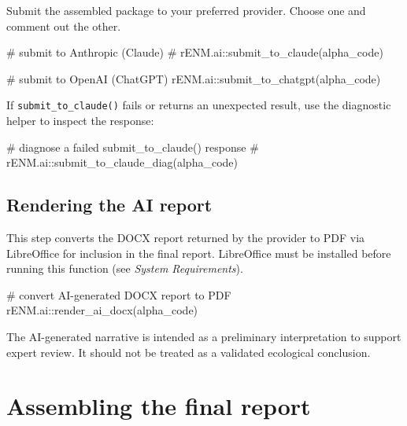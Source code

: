 \documentclass[
  letterpaper,
  DIV=11,
  numbers=noendperiod]{scrartcl}
\newenvironment{Shaded}{\begin{snugshade}}{\end{snugshade}}
\newcommand{\CommentTok}[1]{\textcolor[rgb]{0.37,0.37,0.37}{#1}}
\newcommand{\FunctionTok}[1]{\textcolor[rgb]{0.28,0.35,0.67}{#1}}
\newcommand{\NormalTok}[1]{\textcolor[rgb]{0.00,0.23,0.31}{#1}}
\newcommand{\SpecialCharTok}[1]{\textcolor[rgb]{0.37,0.37,0.37}{#1}}
\begin{document}
Submit the assembled package to your preferred provider. Choose one and
comment out the other.

\begin{Shaded}
\begin{Highlighting}[]
\CommentTok{\# submit to Anthropic (Claude)}
\CommentTok{\# rENM.ai::submit\_to\_claude(alpha\_code)}

\CommentTok{\# submit to OpenAI (ChatGPT)}
\NormalTok{rENM.ai}\SpecialCharTok{::}\FunctionTok{submit\_to\_chatgpt}\NormalTok{(alpha\_code)}
\end{Highlighting}
\end{Shaded}

If \texttt{submit\_to\_claude()} fails or returns an unexpected result,
use the diagnostic helper to inspect the response:

\begin{Shaded}
\begin{Highlighting}[]
\CommentTok{\# diagnose a failed submit\_to\_claude() response}
\CommentTok{\# rENM.ai::submit\_to\_claude\_diag(alpha\_code)}
\end{Highlighting}
\end{Shaded}

\subsection{Rendering the AI report}\label{rendering-the-ai-report}

This step converts the DOCX report returned by the provider to PDF via
LibreOffice for inclusion in the final report. LibreOffice must be
installed before running this function (see \emph{System Requirements}).

\begin{Shaded}
\begin{Highlighting}[]
\CommentTok{\# convert AI{-}generated DOCX report to PDF}
\NormalTok{rENM.ai}\SpecialCharTok{::}\FunctionTok{render\_ai\_docx}\NormalTok{(alpha\_code)}
\end{Highlighting}
\end{Shaded}

The AI-generated narrative is intended as a preliminary interpretation
to support expert review. It should not be treated as a validated
ecological conclusion.

\section{Assembling the final report}\label{assembling-the-final-report}
\end{document}
